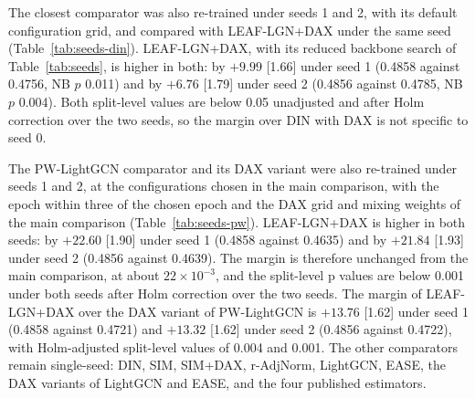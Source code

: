 The closest comparator was also re-trained under seeds 1 and 2, with its default configuration grid, and compared with LEAF-LGN+DAX under
the same seed (Table~\ref{tab:seeds-din}). LEAF-LGN+DAX, with its reduced backbone search of Table~\ref{tab:seeds}, is higher in both: by $+9.99$ [1.66] under seed 1 (0.4858 against 0.4756, NB $p$
0.011) and by $+6.76$ [1.79] under seed 2 (0.4856 against 0.4785, NB $p$ 0.004). Both split-level values are below 0.05 unadjusted and after
Holm correction over the two seeds, so the margin over DIN with DAX is not specific to seed 0. 



The PW-LightGCN comparator and its DAX variant were also re-trained under seeds 1 and 2, at the configurations chosen in the main comparison, with the epoch within three of the chosen epoch and the DAX grid and mixing weights of the main comparison (Table~\ref{tab:seeds-pw}). LEAF-LGN+DAX is higher in both seeds: by $+22.60$ [1.90] under seed 1 (0.4858 against 0.4635) and by $+21.84$ [1.93] under seed 2 (0.4856 against 0.4639). The margin is therefore unchanged from the main comparison, at about $22\times10^{-3}$, and the split-level p values are below 0.001 under both seeds after Holm correction over the two seeds. The margin of LEAF-LGN+DAX over the DAX variant of PW-LightGCN is $+13.76$ [1.62] under seed 1 (0.4858 against 0.4721) and $+13.32$ [1.62] under seed 2 (0.4856 against 0.4722), with Holm-adjusted split-level values of 0.004 and 0.001. The other comparators remain single-seed: DIN, SIM, SIM+DAX, r-AdjNorm, LightGCN, EASE, the DAX variants of LightGCN and EASE, and the four published estimators.


